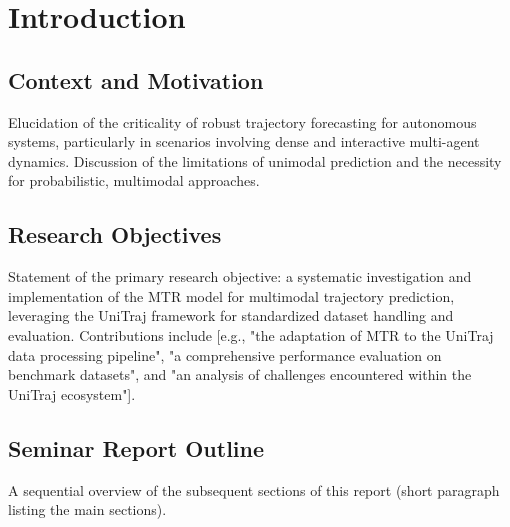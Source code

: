 \chapter{Introduction}
\label{ch:introduction}

\section{Context and Motivation}
\label{sec:introduction_context}
Elucidation of the criticality of robust trajectory forecasting for autonomous systems, particularly in scenarios involving dense and interactive multi-agent dynamics. Discussion of the limitations of unimodal prediction and the necessity for probabilistic, multimodal approaches.

\section{Research Objectives}
\label{sec:introduction_objectives}
Statement of the primary research objective: a systematic investigation and implementation of the MTR model for multimodal trajectory prediction, leveraging the UniTraj framework for standardized dataset handling and evaluation. Contributions include {[e.g., "the adaptation of MTR to the UniTraj data processing pipeline", "a comprehensive performance evaluation on benchmark datasets", and "an analysis of challenges encountered within the UniTraj ecosystem"].}

\section{Seminar Report Outline}
\label{sec:introduction_outline}
A sequential overview of the subsequent sections of this report (short paragraph listing the main sections).